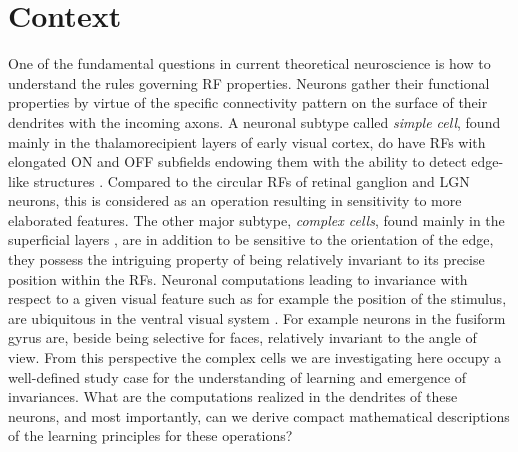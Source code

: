 \section{Context} 

One of the fundamental questions in current theoretical neuroscience is how
to understand the rules governing RF properties. Neurons gather their
functional properties by virtue of the specific connectivity pattern on the
surface of their dendrites with the incoming axons. A neuronal subtype
called \textit{simple cell}, found mainly in the thalamorecipient layers of
early visual cortex, do have RFs with elongated ON and OFF subfields
endowing them with the ability to detect edge-like structures
\citep{hubel1959a}.  Compared to the circular RFs of retinal ganglion
\citep{kuffler1953a,barlow1953a} and LGN \citep{hubel1962a} neurons, this
is considered as an operation resulting in sensitivity to more elaborated
features. The other major subtype, \textit{complex cells}, found mainly in
the superficial layers \citep{martinez2005a}, are in addition to be
sensitive to the orientation of the edge, they possess the intriguing
property of being relatively invariant to its precise position within the
RFs. Neuronal computations leading to invariance with respect to a given
visual feature such as for example the position of the stimulus, are
ubiquitous in the ventral visual system \citep{ito1995a}. For example
neurons in the fusiform gyrus \citep{kanwisher1997a} are, beside being
selective for faces, relatively invariant to the angle of view. From this
perspective the complex cells we are investigating here occupy a
well-defined study case for the understanding of learning and emergence of
invariances. What are the computations realized in the dendrites of these
neurons, and most importantly, can we derive compact mathematical
descriptions of the learning principles for these operations? 

